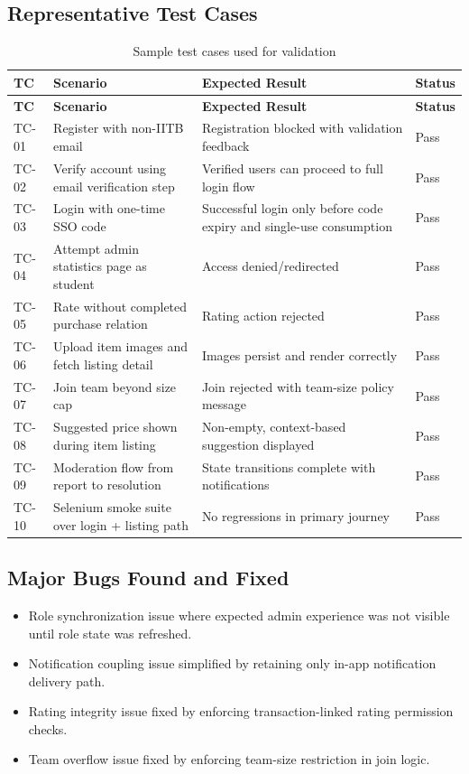 \documentclass[12pt,a4paper]{article}
\begin{document}
\subsection{Representative Test Cases}
\begin{longtable}{p{} p{} p{} p{}}
\caption{Sample test cases used for validation} \\
\toprule
\textbf{TC} & \textbf{Scenario} & \textbf{Expected Result} & \textbf{Status} \\
\midrule
\endfirsthead
\toprule
\textbf{TC} & \textbf{Scenario} & \textbf{Expected Result} & \textbf{Status} \\
\midrule
\endhead
TC-01 & Register with non-IITB email & Registration blocked with validation feedback & Pass \\
TC-02 & Verify account using email verification step & Verified users can proceed to full login flow & Pass \\
TC-03 & Login with one-time SSO code & Successful login only before code expiry and single-use consumption & Pass \\
TC-04 & Attempt admin statistics page as student & Access denied/redirected & Pass \\
TC-05 & Rate without completed purchase relation & Rating action rejected & Pass \\
TC-06 & Upload item images and fetch listing detail & Images persist and render correctly & Pass \\
TC-07 & Join team beyond size cap & Join rejected with team-size policy message & Pass \\
TC-08 & Suggested price shown during item listing & Non-empty, context-based suggestion displayed & Pass \\
TC-09 & Moderation flow from report to resolution & State transitions complete with notifications & Pass \\
TC-10 & Selenium smoke suite over login + listing path & No regressions in primary journey & Pass \\
\bottomrule
\end{longtable}

\subsection{Major Bugs Found and Fixed}
\begin{itemize}[leftmargin=*]
    \item Role synchronization issue where expected admin experience was not visible until role state was refreshed.
    \item Notification coupling issue simplified by retaining only in-app notification delivery path.
    \item Rating integrity issue fixed by enforcing transaction-linked rating permission checks.
    \item Team overflow issue fixed by enforcing team-size restriction in join logic.
\end{itemize}
\end{document}
